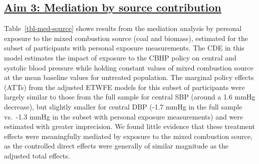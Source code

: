 \documentclass[
  letterpaper,
  DIV=11,
  numbers=noendperiod]{scrartcl}
\providecommand{\DIFadd}[1]{{\protect\color{blue}\underline{#1}}} %
\providecommand{\DIFaddbegin}{} %
\providecommand{\DIFaddend}{} %
\providecommand{\DIFdelbegin}{} %
\providecommand{\DIFdelend}{} %
\newcommand{\DIFscaledelfig}{0.5}
\newlength{\DIFdelgraphicswidth} %
\newlength{\DIFdelgraphicsheight} %
\newcommand{\DIFaddincludegraphics}[2][]{{\color{blue}\fbox{\DIFOincludegraphics[#1]{#2}}}} %
\newcommand{\DIFdelincludegraphics}[2][]{%
\sbox{\DIFdelgraphicsbox}{\DIFOincludegraphics[#1]{#2}}%
\settoboxwidth{\DIFdelgraphicswidth}{\DIFdelgraphicsbox} %
\settoboxtotalheight{\DIFdelgraphicsheight}{\DIFdelgraphicsbox} %
\scalebox{\DIFscaledelfig}{%
\parbox[b]{\DIFdelgraphicswidth}{\usebox{\DIFdelgraphicsbox}\\[-\baselineskip] \rule{\DIFdelgraphicswidth}{0em}}\llap{\resizebox{\DIFdelgraphicswidth}{\DIFdelgraphicsheight}{%
\setlength{\unitlength}{\DIFdelgraphicswidth}%
\begin{picture}(1,1)%
\thicklines\linethickness{2pt} %
{\color[rgb]{1,0,0}\put(0,0){\framebox(1,1){}}}%
{\color[rgb]{1,0,0}\put(0,0){\line( 1,1){1}}}%
{\color[rgb]{1,0,0}\put(0,1){\line(1,-1){1}}}%
\end{picture}%
}\hspace*{3pt}}} %
} %
\DeclareRobustCommand{\DIFaddbegin}{\DIFOaddbegin \let\includegraphics\DIFaddincludegraphics} %
\DeclareRobustCommand{\DIFaddend}{\DIFOaddend \let\includegraphics\DIFOincludegraphics} %
\DeclareRobustCommand{\DIFdelbegin}{\DIFOdelbegin \let\includegraphics\DIFdelincludegraphics} %
\DeclareRobustCommand{\DIFdelend}{\DIFOaddend \let\includegraphics\DIFOincludegraphics} %
\begin{document}
\DIFdelbegin %
\DIFdelend \DIFaddbegin \subsection{\DIFadd{Aim 3: Mediation by source
contribution}}\label{aim-3-mediation-by-source-contribution}
\DIFaddend 

Table~\ref{tbl-med-source} shows results from the mediation analysis by
personal exposure to the mixed combustion source (coal and biomass),
estimated for the subset of participants with personal exposure
measurements. The CDE in this model estimates the impact of exposure to
the CBHP policy on central and systolic blood pressure while holding
constant values of mixed combustion source at the mean baseline values
for untreated population. The marginal policy effects (ATTs) from the
adjusted ETWFE models for this subset of participants were largely
similar to those from the full sample for central SBP (around a 1.6 mmHg
decrease), but slightly smaller for central DBP (-1.7 mmHg in the full
sample vs.~-1.3 mmHg in the subset with personal exposure measurements)
and were estimated with greater imprecision. We found little evidence
that these treatment effects were meaningfully mediated by exposure to
the mixed combustion source, as the controlled direct effects were
generally of similar magnitude as the adjusted total effects.
\end{document}

